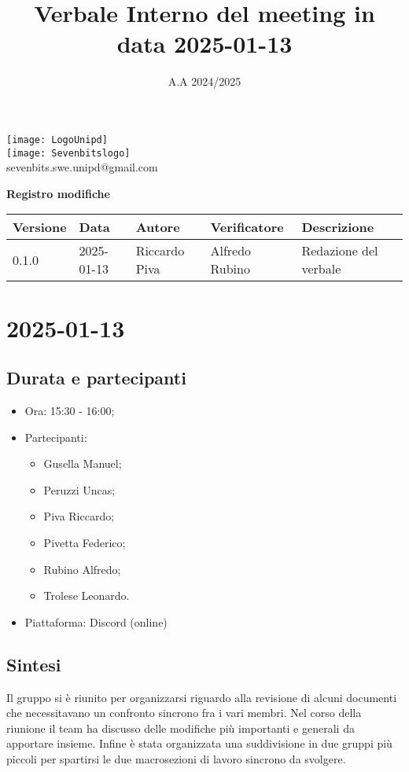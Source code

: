 \documentclass[10pt]{article}
\title{Verbale Interno del meeting in data 2025-01-13}
\date{A.A 2024/2025}
\begin{document}
\maketitle
\begin{center}
\texttt{[image: LogoUnipd]}\\
\texttt{[image: Sevenbitslogo]}\\
sevenbits.swe.unipd@gmail.com\\
\vspace{2mm}

\textbf{Registro modifiche}\\
\vspace{2mm}
\begin{tabularx}{\textwidth}{|l|l|l|l|X|}
\hline
\textbf{Versione} & \textbf{Data} & \textbf{Autore} & \textbf{Verificatore} & \textbf{Descrizione} \\
\hline
0.1.0 & 2025-01-13 & Riccardo Piva & Alfredo Rubino & Redazione del verbale \\
\hline
\end{tabularx}
\end{center}

\newpage
\tableofcontents
\newpage
\section{2025-01-13}
\subsection{Durata e partecipanti}
\begin{itemize}
\item Ora: 15:30 - 16:00;
\item Partecipanti: 	
	\begin{itemize}
		\item Gusella Manuel;
		\item Peruzzi Uncas;
		\item Piva Riccardo;
		\item Pivetta Federico;
		\item Rubino Alfredo;
		\item Trolese Leonardo.
	\end{itemize}
\item Piattaforma: Discord (online)
\end{itemize}

\subsection{Sintesi}
Il gruppo si è riunito per organizzarsi riguardo alla revisione di alcuni documenti che necessitavano un confronto sincrono fra i vari membri.
Nel corso della riunione il team ha discusso delle modifiche più importanti e generali da apportare insieme. Infine è stata organizzata una suddivisione
in due gruppi più piccoli per spartirsi le due macrosezioni di lavoro sincrono da svolgere.
\end{document}
